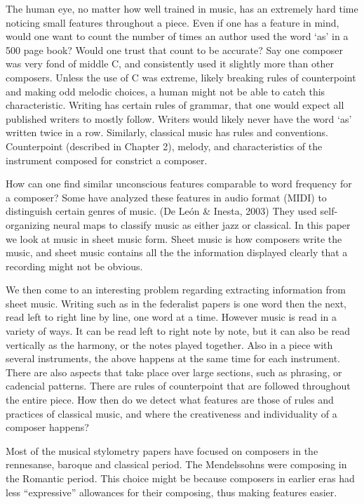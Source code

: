 \documentclass[12pt,twoside]{reedthesis}
\theoremstyle{definition}
\theoremstyle{definition}
\theoremstyle{definition}
\theoremstyle{remark}
\begin{document}
The human eye, no matter how well trained in music, has an extremely
hard time noticing small features throughout a piece. Even if one has a
feature in mind, would one want to count the number of times an author
used the word `as' in a 500 page book? Would one trust that count to be
accurate? Say one composer was very fond of middle C, and consistently
used it slightly more than other composers. Unless the use of C was
extreme, likely breaking rules of counterpoint and making odd melodic
choices, a human might not be able to catch this characteristic. Writing
has certain rules of grammar, that one would expect all published
writers to mostly follow. Writers would likely never have the word `as'
written twice in a row. Similarly, classical music has rules and
conventions. Counterpoint (described in Chapter 2), melody, and
characteristics of the instrument composed for constrict a composer.

How can one find similar unconscious features comparable to word
frequency for a composer? Some have analyzed these features in audio
format (MIDI) to distinguish certain genres of music. (De León \&
Inesta, 2003) They used self-organizing neural maps to classify music as
either jazz or classical. In this paper we look at music in sheet music
form. Sheet music is how composers write the music, and sheet music
contains all the the information displayed clearly that a recording
might not be obvious.

We then come to an interesting problem regarding extracting information
from sheet music. Writing such as in the federalist papers is one word
then the next, read left to right line by line, one word at a time.
However music is read in a variety of ways. It can be read left to right
note by note, but it can also be read vertically as the harmony, or the
notes played together. Also in a piece with several instruments, the
above happens at the same time for each instrument. There are also
aspects that take place over large sections, such as phrasing, or
cadencial patterns. There are rules of counterpoint that are followed
throughout the entire piece. How then do we detect what features are
those of rules and practices of classical music, and where the
creativeness and individuality of a composer happens?

Most of the musical stylometry papers have focused on composers in the
rennesanse, baroque and classical period. The Mendelssohns were
composing in the Romantic period. This choice might be because composers
in earlier eras had less ``expressive'' allowances for their composing,
thus making features easier.
\end{document}
